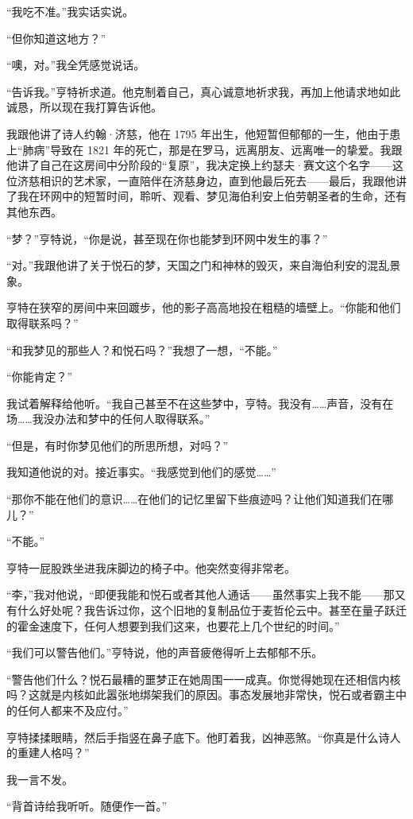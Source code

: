 \documentclass[AutoFakeBold=true]{book}
\begin{document}
``我吃不准。''我实话实说。

``但你知道这地方？''

``噢，对。''我全凭感觉说话。

``告诉我。''亨特祈求道。他克制着自己，真心诚意地祈求我，再加上他请求地如此诚恳，所以现在我打算告诉他。

我跟他讲了诗人约翰·济慈，他在 1795 年出生，他短暂但郁郁的一生，他由于患上``肺病''导致在 1821 年的死亡，那是在罗马，远离朋友、远离唯一的挚爱。我跟他讲了自己在这房间中分阶段的``复原''，我决定换上约瑟夫·赛文这个名字——这位济慈相识的艺术家，一直陪伴在济慈身边，直到他最后死去——最后，我跟他讲了我在环网中的短暂时间，聆听、观看、梦见海伯利安上伯劳朝圣者的生命，还有其他东西。

``梦？''亨特说，``你是说，甚至现在你也能梦到环网中发生的事？''

``对。''我跟他讲了关于悦石的梦，天国之门和神林的毁灭，来自海伯利安的混乱景象。

亨特在狭窄的房间中来回踱步，他的影子高高地投在粗糙的墙壁上。``你能和他们取得联系吗？''

``和我梦见的那些人？和悦石吗？''我想了一想，``不能。''

``你能肯定？''

我试着解释给他听。``我自己甚至不在这些梦中，亨特。我没有……声音，没有在场……我没办法和梦中的任何人取得联系。''

``但是，有时你梦见他们的所思所想，对吗？''

我知道他说的对。接近事实。``我感觉到他们的感觉……''

``那你不能在他们的意识……在他们的记忆里留下些痕迹吗？让他们知道我们在哪儿？''

``不能。''

亨特一屁股跌坐进我床脚边的椅子中。他突然变得非常老。

``李，''我对他说，``即便我能和悦石或者其他人通话——虽然事实上我不能——那又有什么好处呢？我告诉过你，这个旧地的复制品位于麦哲伦云中。甚至在量子跃迁的霍金速度下，任何人想要到我们这来，也要花上几个世纪的时间。''

``我们可以警告他们。''亨特说，他的声音疲倦得听上去郁郁不乐。

``警告他们什么？悦石最糟的噩梦正在她周围一一成真。你觉得她现在还相信内核吗？这就是内核如此嚣张地绑架我们的原因。事态发展地非常快，悦石或者霸主中的任何人都来不及应付。''

亨特揉揉眼睛，然后手指竖在鼻子底下。他盯着我，凶神恶煞。``你真是什么诗人的重建人格吗？''

我一言不发。

``背首诗给我听听。随便作一首。''
\end{document}
